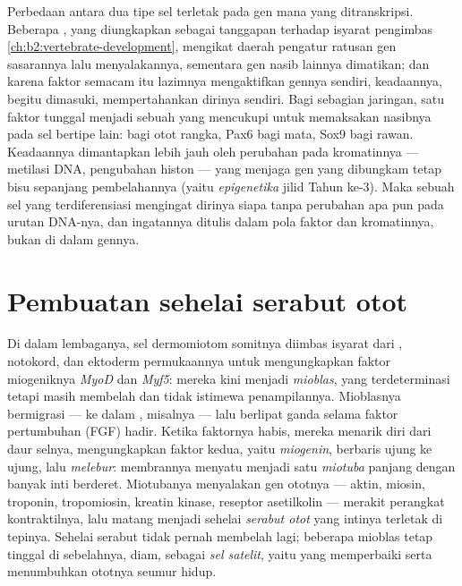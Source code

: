 \begin{proposition}\label{prop:b2:cell-differentiation:transcriptional}
Perbedaan antara dua tipe sel terletak pada gen mana yang
ditranskripsi. Beberapa \emph{}, yang diungkapkan
sebagai tanggapan terhadap isyarat pengimbas
\cref{ch:b2:vertebrate-development}, mengikat daerah pengatur ratusan
gen sasarannya lalu menyalakannya, sementara gen nasib lainnya
dimatikan; dan karena faktor semacam itu lazimnya mengaktifkan gennya
sendiri, keadaannya, begitu dimasuki, mempertahankan dirinya sendiri.
Bagi sebagian jaringan, satu faktor tunggal menjadi sebuah
\emph{} yang mencukupi untuk memaksakan nasibnya pada
sel bertipe lain:  bagi otot rangka, Pax6 bagi mata, Sox9 bagi
rawan. Keadaannya dimantapkan lebih jauh oleh perubahan pada
kromatinnya --- metilasi DNA, pengubahan histon --- yang menjaga gen
yang dibungkam tetap bisu sepanjang pembelahannya (yaitu
\emph{epigenetika} jilid Tahun ke-3). Maka sebuah sel yang
terdiferensiasi mengingat dirinya siapa tanpa perubahan apa pun pada
urutan DNA-nya, dan ingatannya ditulis dalam pola faktor dan
kromatinnya, bukan di dalam gennya.
\end{proposition}

\section{Pembuatan sehelai serabut otot}

\begin{definition}[Miogenesis]\label{def:b2:cell-differentiation:myogenesis}
Di dalam lembaganya, sel dermomiotom somitnya diimbas isyarat dari
, notokord, dan ektoderm permukaannya untuk mengungkapkan
faktor miogeniknya \emph{MyoD} dan \emph{Myf5}: mereka kini menjadi
\emph{mioblas}, yang terdeterminasi tetapi masih membelah dan tidak
istimewa penampilannya. Mioblasnya bermigrasi --- ke dalam , misalnya --- lalu berlipat ganda selama faktor pertumbuhan
(FGF) hadir. Ketika faktornya habis, mereka menarik diri dari daur
selnya, mengungkapkan faktor kedua, yaitu \emph{miogenin}, berbaris
ujung ke ujung, lalu \emph{melebur}: membrannya menyatu menjadi satu
\emph{miotuba} panjang dengan banyak inti berderet. Miotubanya
menyalakan gen ototnya --- aktin, miosin, troponin, tropomiosin,
kreatin kinase, reseptor asetilkolin --- merakit perangkat
kontraktilnya, lalu matang menjadi sehelai \emph{serabut otot} yang
intinya terletak di tepinya. Sehelai serabut tidak pernah membelah
lagi; beberapa mioblas tetap tinggal di sebelahnya, diam, sebagai
\emph{sel satelit}, yaitu  yang memperbaiki serta
menumbuhkan ototnya seumur hidup.
\end{definition}

